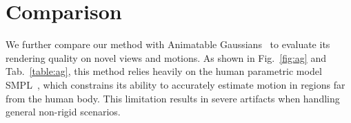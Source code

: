 \section{Comparison} \label{suppl:comparison} 

We further compare our method with Animatable Gaussians~\cite{li2024animatable} to evaluate its rendering quality on novel views and motions. As shown in Fig.~\ref{fig:ag} and Tab.~\ref{table:ag}, this method relies heavily on the human parametric model SMPL~\cite{SMPL2015}, which constrains its ability to accurately estimate motion in regions far from the human body. This limitation results in severe artifacts when handling general non-rigid scenarios.


\begin{table}[t]
    \centering

    \caption{
    Quantitative comparison with Animatable Gaussians~\cite{li2024animatable}. 
    }
    \label{table:ag}
\end{table}



\begin{table}[t]
    \centering

    \caption{ 
    Quantitative Ablation Study on the different input view numbers.
    }
    \label{table:ab1}
\end{table}





